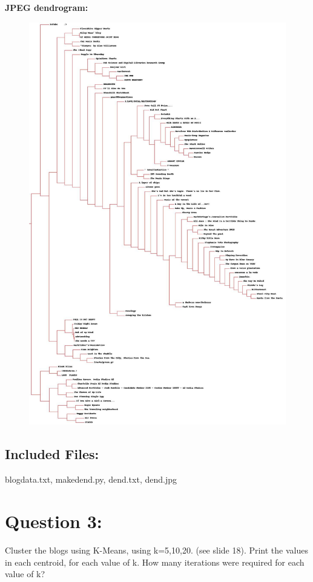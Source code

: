 \documentclass[a4paper, 11pt]{article}
\begin{document}
\begin{lstlisting}[language=bash, breakatwhitespace=〈false), label=Running makedend.py, caption=Running makedend.py]
\end{lstlisting}

\textbf{JPEG dendrogram:}
\begin{figure}[H]
\centering
\includegraphics[scale=0.35]{dend.jpg}
\end{figure}

\subsection*{Included Files:}
blogdata.txt, makedend.py, dend.txt, dend.jpg

\section*{Question 3:}
Cluster the blogs using K-Means, using k=5,10,20. (see slide 18).  Print the values in each centroid, for each value of k.  How many iterations were required for each value of k?
\end{document}
